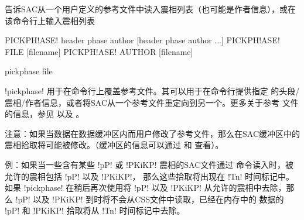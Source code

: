 \label{cmd:pickphase}

告诉SAC从一个用户定义的参考文件中读入震相列表（也可能是作者信息），或在
该命令行上输入震相列表

\begin{SACSTX}
PICKPH!ASE! header phase author [header phase author ...]
PICKPH!ASE! FILE [filename]
PICKPH!ASE! AUTHOR [filename]
\end{SACSTX}


\begin{SACDFT}
pickphase file
\end{SACDFT}

!pickphase! 用于在命令行上覆盖参考文件。其可以用于在命令行提供指定
的头段/震相/作者信息，或者将SAC从一个参考文件重定向到另一个。更多关于参考
文件的信息，参见  以及 。

注意：如果当数据在数据缓冲区内而用户修改了参考文件，那么在SAC缓冲区中的
震相拾取将可能被修改。（缓冲区的信息可以通过  和
 查看）。

例：如果当一些含有某些 !pP! 或 !PKiKP! 震相的SAC文件通过
 命令读入时，被允许的震相包括 !pP! 以及 !PKiKP!，
那么这些拾取将出现在 !Tn! 时间标记中。如果 !pickphase!
在稍后再次使用将 !pP! 以及 !PKiKP! 从允许的震相中去除，那么
!pP! 以及 !PKiKP! 到时将不会从CSS文件中读取，已经在内存中的
数据的 !pP! 和 !PKiKP! 拾取将从 !Tn!  时间标记中去除。
